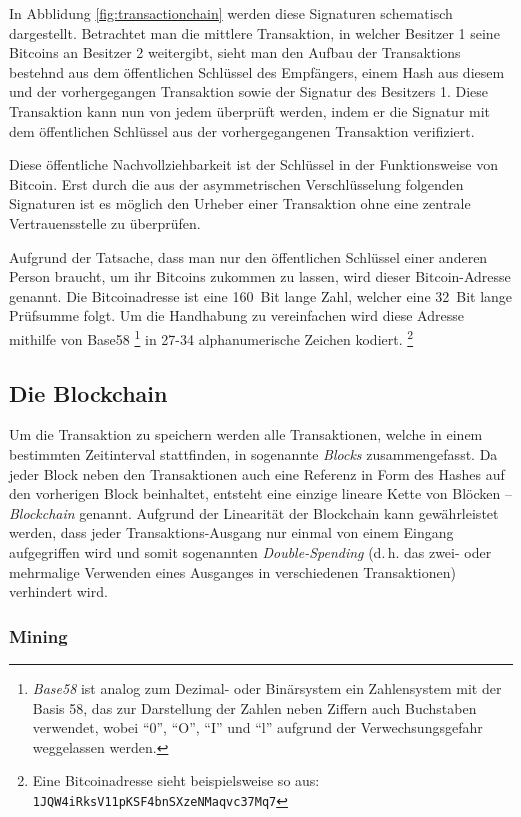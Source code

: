 In Abblidung \ref{fig:transactionchain} werden diese Signaturen schematisch dargestellt.
Betrachtet man die mittlere Transaktion, in welcher Besitzer 1 seine Bitcoins an Besitzer 2 weitergibt, sieht man den Aufbau der Transaktions bestehnd aus dem öffentlichen Schlüssel des Empfängers, einem Hash aus diesem und der vorhergegangen Transaktion sowie der Signatur des Besitzers 1.
Diese Transaktion kann nun von jedem überprüft werden, indem er die Signatur mit dem öffentlichen Schlüssel aus der vorhergegangenen Transaktion verifiziert.

Diese öffentliche Nachvollziehbarkeit ist der Schlüssel in der Funktionsweise von Bitcoin.
Erst durch die aus der asymmetrischen Verschlüsselung folgenden Signaturen ist es möglich den Urheber einer Transaktion ohne eine zentrale Vertrauensstelle zu überprüfen.

Aufgrund der Tatsache, dass man nur den öffentlichen Schlüssel einer anderen Person braucht, um ihr Bitcoins zukommen zu lassen, wird dieser Bitcoin-Adresse genannt.
Die Bitcoinadresse ist eine 160~Bit lange Zahl, welcher eine 32~Bit lange Prüfsumme folgt.
Um die Handhabung zu vereinfachen wird diese Adresse mithilfe von Base58%
\footnote{\emph{Base58} ist analog zum Dezimal- oder Binärsystem ein Zahlensystem mit der Basis 58, das zur Darstellung der Zahlen neben Ziffern auch Buchstaben verwendet, wobei "`0"', "`O"', "`I"' und "`l"' aufgrund der Verwechsungsgefahr weggelassen werden.}
in 27-34 alphanumerische Zeichen kodiert.%
\footnote{Eine Bitcoinadresse sieht beispielsweise so aus: \texttt{1JQW4iRksV11pKSF4bnSXzeNMaqvc37Mq7}}

\subsection{Die Blockchain}

Um die Transaktion zu speichern werden alle Transaktionen, welche in einem bestimmten Zeitinterval stattfinden, in sogenannte \emph{Blocks} zusammengefasst.
Da jeder Block neben den Transaktionen auch eine Referenz in Form des Hashes auf den vorherigen Block beinhaltet, entsteht eine einzige lineare Kette von Blöcken -- \emph{Blockchain} genannt.
Aufgrund der Linearität der Blockchain kann gewährleistet werden, dass jeder Transaktions-Ausgang nur einmal von einem Eingang aufgegriffen wird und somit sogenannten \emph{Double-Spending} (d.\,h. das zwei- oder mehrmalige Verwenden eines Ausganges in verschiedenen Transaktionen) verhindert wird.

\subsubsection{Mining}
\label{subsec:mining}

